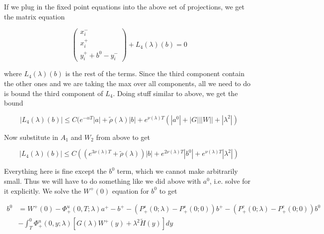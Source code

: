 \documentclass[12pt]{article}
\begin{document}
\begin{enumerate}
If we plug in the fixed point equations into the above set of projections, we get the matrix equation

\[ 
\begin{pmatrix}x_i^- \\ x_i^+ \\ y_i^+ + b^0 - y_i^- \end{pmatrix} + L_4(\lambda)(b) = 0
\]

where $L_4(\lambda)(b)$ is the rest of the terms. Since the third component contain the other ones and we are taking the max over all components, all we need to do is bound the third component of $L_4$. Doing stuff similar to above, we get the bound

\[
|L_4(\lambda)(b)| \leq C( e^{-\alpha T}|a| + \tilde{\rho}(\lambda)|b| + e^{\nu(\lambda)T}(|a^0| + |G|||W|| + |\lambda^2|)
\]

Now substitute in $A_1$ and $W_2$ from above to get

\[
|L_4(\lambda)(b)| \leq C( (e^{3\nu(\lambda)T} + \tilde{\rho}(\lambda))|b| + e^{2\nu(\lambda)T}|b^0| + e^{\nu(\lambda)T} |\lambda^2| )
\]

Everything here is fine except the $b^0$ term, which we cannot make arbitrarily small. Thus we will have to do something like we did above with $a^0$, i.e. solve for it explicitly. We solve the $W^+(0)$ equation for $b^0$ to get

\begin{align*}
b^0 &= W^+(0) - \Phi^u_+(0, T; \lambda)a^+ - b^+ - (P^s_+(0;\lambda) - P^s_+(0;0))b^+ - (P^c_+(0;\lambda) - P^c_+(0;0))b^0 \\
&- \int_T^0 \Phi^u_+(0, y; \lambda) [ G(\lambda)W^+(y) + \lambda^2 \tilde{H}(y) ] dy  
\end{align*}


\end{enumerate}
\end{document}
